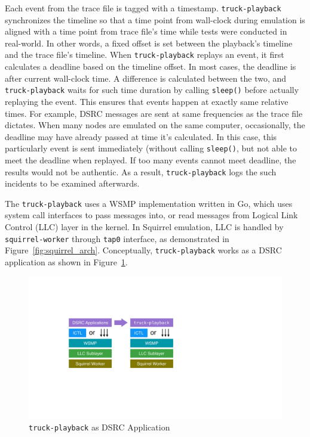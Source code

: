 \documentclass[12pt]{report}
\begin{document}
Each event from the trace file is tagged with a timestamp. \texttt{truck-playback} synchronizes the timeline so that a time point from wall-clock during emulation is aligned with a time point from trace file's time while tests were conducted in real-world. In other words, a fixed offset is set between the playback's timeline and the trace file's timeline. When \texttt{truck-playback} replays an event, it first calculates a deadline based on the timeline offset. In most cases, the deadline is after current wall-clock time. A difference is calculated between the two, and \texttt{truck-playback} waits for such time duration by calling \texttt{sleep()} before actually replaying the event. This ensures that events happen at exactly same relative times. For example, DSRC messages are sent at same frequencies as the trace file dictates. When many nodes are emulated on the same computer, occasionally, the deadline may have already passed at time it's calculated. In this case, this particularly event is sent immediately (without calling \texttt{sleep()}, but not able to meet the deadline when replayed. If too many events cannot meet deadline, the results would not be authentic. As a result, \texttt{truck-playback} logs the such incidents to be examined afterwards.

The \texttt{truck-playback} uses a WSMP implementation written in Go, which uses system call interfaces to pass messages into, or read messages from Logical Link Control (LLC) layer in the kernel. In Squirrel emulation, LLC is handled by \texttt{squirrel-worker} through \texttt{tap0} interface, as demonstrated in Figure~\ref{fig:squirrel_arch}. Conceptually, \texttt{truck-playback} works as a DSRC application as shown in Figure~\ref{fig:playback_arch}.

\begin{figure}[h]
  \begin{center}
    \includegraphics[width=.6\textwidth]{figures/playback_arch.pdf}
    \caption{\label{fig:playback_arch}\texttt{truck-playback} as DSRC Application}
  \end{center}
\end{figure}
\end{document}
